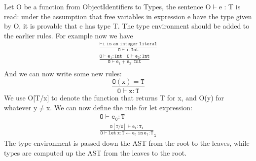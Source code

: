 Let O be a function from ObjectIdentifiers to Types, the sentence O$\vdash$e : T is read: under the assumption that free variables in expression e have the type given by O, it is provable that e has type T. The type environment should be added to the earlier rules. For example now we have
\begin{gather*}
\mathtt{\frac{\vdash\text{i is an integer literal}}{O\vdash i:Int}}\\
\mathtt{\frac{O\vdash e_1:Int\quad O\vdash e_2 :Int}{O\vdash e_1+e_2:Int}}\\
\end{gather*}
And we can now write some new rules:
\begin{equation*}
\mathtt{\frac{O(x) = T}{O\vdash x : T}}
\end{equation*}
We use O[T/x] to denote the function that returns T for x, and O(y) for whatever y$\neq$x. We can now define the rule for {\sf let} expression:
\begin{gather}
\mathtt{O\vdash e_0: T}\nonumber\\
\mathtt{\frac{O[T/x]\vdash e_1:T_1}{O\vdash let\:x:T\leftarrow e_0\:in\:e_1:T}_1}\label{oldlet}
\end{gather}
The type environment is passed down the AST from the root to the leaves, while types are computed up the AST from the leaves to the root.
